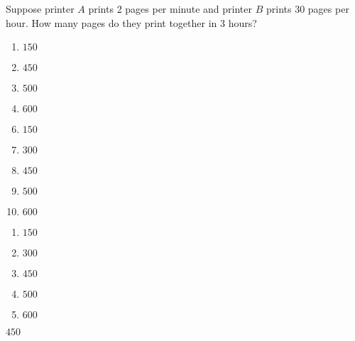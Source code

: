 



 Suppose printer $A$ prints 2 pages per minute and printer $B$ prints 30 pages per hour.  How many pages do they print together in 3 hours?


\ifsat
	\begin{enumerate}[label=\Alph*)]
		\item   $150$
		\item  $450$%
		\item  $500$
		\item  $600$
	\end{enumerate}
\else
\fi

\ifacteven
	\begin{enumerate}[label=\textbf{\Alph*.},itemsep=\fill,align=left]
		\setcounter{enumii}{5}
		\item   $150$
		\item  $300$
		\item  $450$%
		\addtocounter{enumii}{1}
		\item  $500$
		\item  $600$
	\end{enumerate}
\else
\fi

\ifactodd
	\begin{enumerate}[label=\textbf{\Alph*.},itemsep=\fill,align=left]
		\item   $150$
		\item  $300$
		\item  $450$%
		\item  $500$
		\item  $600$
	\end{enumerate}
\else
\fi

\ifgridin
  $450$%
		
\else
\fi

